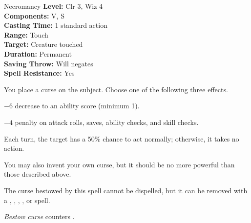 {Necromancy}
{
	\textbf{Level:}
	Clr 3, Wiz 4\\
	\textbf{Components:}
	V, S\\
	\textbf{Casting Time:}
	1 standard action\\
	\textbf{Range:}
	Touch\\
	\textbf{Target:}
	Creature touched\\
	\textbf{Duration:}
	Permanent\\
	\textbf{Saving Throw:}
	Will negates\\
	\textbf{Spell Resistance:}
	Yes\\
}
{
	You place a curse on the subject. Choose one of the following three effects.
\begin{itemize*}
\item $-6$ decrease to an ability score (minimum 1).
\item $-4$ penalty on attack rolls, saves, ability checks, and skill checks.
\item Each turn, the target has a 50\% chance to act normally; otherwise, it takes no action.
\end{itemize*}

	You may also invent your own curse, but it should be no more powerful than those described above.

	The curse bestowed by this spell cannot be dispelled, but it can be removed with a , , , , or  spell.

	\emph{Bestow curse} counters .

}
